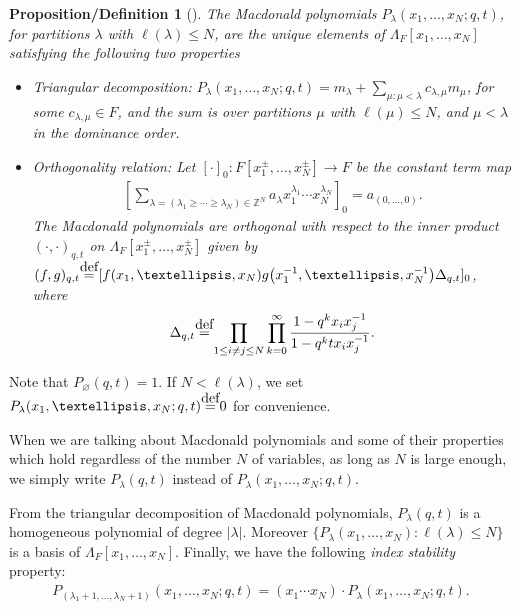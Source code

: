 \documentclass[11pt]{article}
\numberwithin{equation}{section}
\newcommand\myeq{\mathrel{\stackrel{\makebox[0pt]{\mbox{\normalfont\tiny def}}}{=}}}
\newtheorem{dfprop}[thm]{Proposition/Definition}
\newcommand{\Z}{\mathbb{Z}}
\begin{document}
\begin{dfprop}[{\cite[Chapter~VI, Sections~3, 4, 9]{M2}}]\label{def:macdonaldpolys}
The \textit{Macdonald polynomials} $P_{\lambda}(x_1, \dots, x_N; q, t)$, for partitions $\lambda$ with $\ell(\lambda) \leq N$, are the unique elements of $\Lambda_F[x_1, \dots, x_N]$ satisfying the following two properties
\begin{itemize}\itemsep=0pt
	\item \textit{Triangular decomposition}: $\displaystyle P_{\lambda}(x_1, \dots, x_N; q, t) = m_{\lambda} + \sum\limits_{\mu\colon \mu < \lambda}{c_{\lambda, \mu}m_{\mu}}$, for some $c_{\lambda, \mu}\in F$, and the sum is over partitions $\mu$ with $\ell(\mu) \leq N$, and $\mu < \lambda$ in the dominance order.

	\item \textit{Orthogonality relation}: Let $[\cdot]_0 \colon F[x_1^{\pm}, \dots, x_N^{\pm}] \rightarrow F$ be the constant term map
\begin{gather*}
\left[ \sum_{\lambda = (\lambda_1 \geq \cdots \geq \lambda_N) \in \Z^N}{a_{\lambda}x_1^{\lambda_1}\cdots x_N^{\lambda_N}} \right]_0 = a_{(0, \dots, 0)}.
\end{gather*}
The Macdonald polynomials are orthogonal with respect to the inner product $(\cdot, \cdot)_{q, t}$ on $\Lambda_F[x_1^{\pm}, \dots, x_N^{\pm}]$ given by $\displaystyle (f, g)_{q, t} \myeq [f(x_1, \dots, x_N)g\big(x_1^{-1}, \dots, x_N^{-1}\big)\Delta_{q, t}]_0$, where
\[
\Delta_{q, t} \myeq \prod_{1\leq i\neq j\leq N}\prod_{k=0}^{\infty}{\frac{1 - q^{k}x_ix_j^{-1}}{1 - q^{k}tx_ix_j^{-1}}}.
\]
\end{itemize}
\end{dfprop}

Note that $P_{\varnothing}(q, t) = 1$. If $N < \ell(\lambda)$, we set $P_{\lambda}(x_1, \dots, x_N; q, t) \myeq 0$ for convenience.

When we are talking about Macdonald polynomials and some of their properties which hold regardless of the number $N$ of variables, as long as $N$ is large enough, we simply write $P_{\lambda}(q, t)$ instead of $P_{\lambda}(x_1, \dots, x_N; q, t)$.

From the triangular decomposition of Macdonald polynomials, $P_{\lambda}(q, t)$ is a homogeneous polynomial of degree $|\lambda|$. Moreover $\{P_{\lambda}(x_1, \dots, x_N) \colon \ell(\lambda) \leq N\}$ is a basis of $\Lambda_F[x_1, \dots, x_N]$. Finally, we have the following \textit{index stability} property:
\begin{gather}\label{macdonaldsignatures1}
P_{(\lambda_1 + 1, \dots, \lambda_N + 1)}(x_1, \dots, x_N; q, t) = (x_1\cdots x_N)\cdot P_{\lambda}(x_1, \dots, x_N; q, t).
\end{gather}
\end{document}

